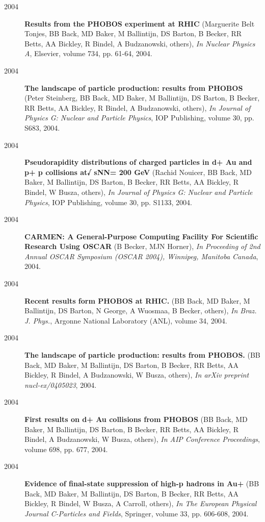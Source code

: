 \begin{description}
\item[2004]{\bf Results from the PHOBOS experiment at RHIC} (Marguerite Belt Tonjes, BB Back, MD Baker, M Ballintijn, DS Barton, B Becker, RR Betts, AA Bickley, R Bindel, A Budzanowski, others), {\em In Nuclear Physics A}, Elsevier, volume 734, pp. 61-64, 2004.
\item[2004]{\bf The landscape of particle production: results from PHOBOS} (Peter Steinberg, BB Back, MD Baker, M Ballintijn, DS Barton, B Becker, RR Betts, AA Bickley, R Bindel, A Budzanowski, others), {\em In Journal of Physics G: Nuclear and Particle Physics}, IOP Publishing, volume 30, pp. S683, 2004.
\item[2004]{\bf Pseudorapidity distributions of charged particles in d+ Au and p+ p collisions at√ sNN= 200 GeV} (Rachid Nouicer, BB Back, MD Baker, M Ballintijn, DS Barton, B Becker, RR Betts, AA Bickley, R Bindel, W Busza, others), {\em In Journal of Physics G: Nuclear and Particle Physics}, IOP Publishing, volume 30, pp. S1133, 2004.
\item[2004]{\bf CARMEN: A General-Purpose Computing Facility For Scientific Research Using OSCAR} (B Becker, MJN Horner), {\em In Proceeding of 2nd Annual OSCAR Symposium (OSCAR 2004), Winnipeg, Manitoba Canada}, 2004.
\item[2004]{\bf Recent results form PHOBOS at RHIC.} (BB Back, MD Baker, M Ballintijn, DS Barton, N George, A Wuosmaa, B Becker, others), {\em In Braz. J. Phys.}, Argonne National Laboratory (ANL), volume 34, 2004.
\item[2004]{\bf The landscape of particle production: results from PHOBOS.} (BB Back, MD Baker, M Ballintijn, DS Barton, B Becker, RR Betts, AA Bickley, R Bindel, A Budzanowski, W Busza, others), {\em In arXiv preprint nucl-ex/0405023}, 2004.
\item[2004]{\bf First results on d+ Au collisions from PHOBOS} (BB Back, MD Baker, M Ballintijn, DS Barton, B Becker, RR Betts, AA Bickley, R Bindel, A Budzanowski, W Busza, others), {\em In AIP Conference Proceedings}, volume 698, pp. 677, 2004.
\item[2004]{\bf Evidence of final-state suppression of high-p hadrons in Au+} (BB Back, MD Baker, M Ballintijn, DS Barton, B Becker, RR Betts, AA Bickley, R Bindel, W Busza, A Carroll, others), {\em In The European Physical Journal C-Particles and Fields}, Springer, volume 33, pp. 606-608, 2004.

\end{description}
